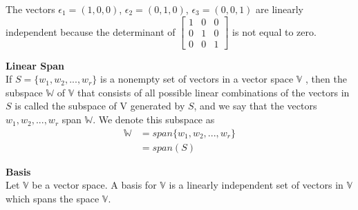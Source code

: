 \documentclass[12pt]{report}
\def\W{{\mathbb W}}
\def\V{{ \mathbb V}}
\begin{document}
The vectors $\epsilon_1=(1,0,0)$, $\epsilon_2=(0,1,0)$, $\epsilon_3=(0,0,1)$ are linearly independent because the determinant of $
\begin{bmatrix} 1&0&0\\0&1&0\\0&0&1 \end{bmatrix}$ is not equal to zero.
\begin{defn}
\textbf{Linear Span}\\
If $S = \{w_1, w_2, . . ., w_r \}$ is a nonempty set of vectors in a vector space  $\V$ , then the subspace $\W$ of  $\V$ that consists of all possible linear combinations of the vectors in $S$ is called the subspace of V generated by $S$, and we say that the vectors $w_1, w_2, . . ., w_r$ span $\W$. We denote this subspace as
\begin{equation}
\begin{split}
\W &= span\{ w_1, w_2, . . . , w_r \}\\
&= span(S)
\end{split}
\end{equation}
\end{defn}
\begin{defn}
\textbf{Basis}\\
Let $\V$ be a vector space. A basis for $\V$ is a linearly independent set of vectors in $\V$ which spans the space $\V$. 
\end{defn}
\end{document}
